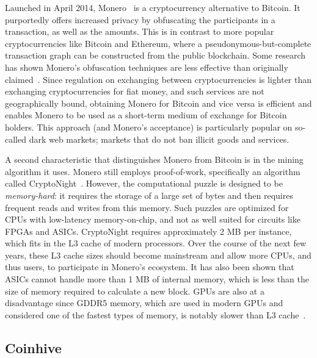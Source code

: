Launched in April 2014, Monero~\cite{monero} is a cryptocurrency alternative to Bitcoin. It purportedly offers increased privacy by obfuscating the participants in a transaction, as well as the amounts. This is in contrast to more popular cryptocurrencies like Bitcoin and Ethereum, where a pseudonymous-but-complete transaction graph can be constructed from the public blockchain. Some research has shown Monero's obfuscation techniques are less effective than originally claimed~\cite{MMLN17,kumar2017traceability}. Since regulation on exchanging between cryptocurrencies is lighter than exchanging cryptocurrencies for fiat money, and such services are not geographically bound, obtaining Monero for Bitcoin and vice versa is efficient and enables Monero to be used as a short-term medium of exchange for Bitcoin holders. This approach (and Monero's acceptance) is particularly popular on so-called dark web markets; markets that do not ban illicit goods and services.

A second characteristic that distinguishes Monero from Bitcoin is in the mining algorithm it uses. Monero still employs proof-of-work, specifically an algorithm called CryptoNight~\cite{cryptoknight}. However, the computational puzzle is designed to be \textit{memory-hard}: it requires the storage of a large set of bytes and then requires frequent reads and writes from this memory. Such puzzles are optimized for CPUs with low-latency memory-on-chip, and not as well suited for circuits like FPGAs and ASICs. CryptoNight requires approximately 2 MB per instance, which fits in the L3 cache of modern processors. Over the course of the next few years, these L3 cache sizes should become mainstream and allow more CPUs, and thus users, to participate in Monero's ecosystem. It has also been shown that ASICs cannot handle more than 1 MB of internal memory, which is less than the size of memory required to calculate a new block. GPUs are also at a disadvantage since GDDR5 memory, which are used in modern GPUs and considered one of the fastest types of memory, is notably slower than L3 cache~\cite{van2013cryptonote}.  


\subsection{Coinhive}



